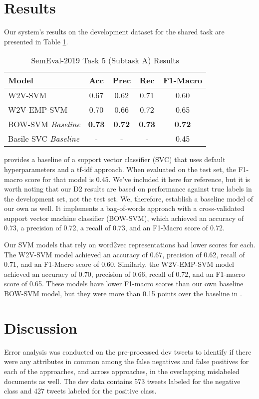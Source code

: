 \documentclass[11pt,a4paper]{article}
\begin{document}
\section{Results}
Our system's results on the development dataset for the shared task are presented in Table \ref{tab:results}.


\begin{table}[h]
\centering
\caption{SemEval-2019 Task 5 (Subtask A) Results}
\label{tab:results}
\footnotesize
\begin{tabular}{lcccc}
\hline
Model & Acc & Prec & Rec & F1-Macro \\ \hline
\textsc{W2V-SVM} & 0.67 & 0.62 & 0.71 & 0.60 \\
\textsc{W2V-EMP-SVM} & 0.70 & 0.66 & 0.72 & 0.65 \\
\textsc{BOW-SVM} \textit{Baseline} & \textbf{0.73} & \textbf{0.72} & \textbf{0.73} & \textbf{0.72} \\
Basile SVC \textit{Baseline} & - & - & - & 0.45 \\ \hline
\end{tabular}
\end{table}

\citet{basile-etal-2019-semeval} provides a baseline of a support vector classifier (SVC) that uses default hyperparameters and a tf-idf approach. When evaluated on the test set, the F1-macro score for that model is 0.45. We’ve included it here for reference, but it is worth noting that our D2 results are based on performance against true labels in the development set, not the test set. We, therefore, establish a baseline model of our own as well. It implements a bag-of-words approach with a cross-validated support vector machine classifier (\textsc{BOW-SVM}), which achieved an accuracy of 0.73, a precision of 0.72, a recall of 0.73, and an F1-Macro score of 0.72.

Our SVM models that rely on word2vec representations had lower scores for each. The \textsc{W2V-SVM} model achieved an accuracy of 0.67, precision of 0.62, recall of 0.71, and an F1-Macro score of 0.60. Similarly, the \textsc{W2V-EMP-SVM} model achieved an accuracy of 0.70, precision of 0.66, recall of 0.72, and an F1-macro score of 0.65. These models have lower F1-macro scores than our own baseline \textsc{BOW-SVM} model, but they were more than 0.15 points over the baseline in \citet{basile-etal-2019-semeval}.




\section{Discussion}
Error analysis was conducted on the pre-processed dev tweets to identify if there were any attributes in common among the false negatives and false positives for each of the approaches, and across approaches, in the overlapping mislabeled documents as well. The dev data contains 573 tweets labeled for the negative class and 427 tweets labeled for the positive class.
\end{document}
